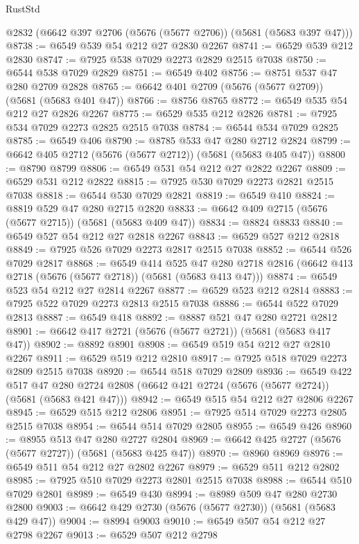 \begin{lexlean}{RustStd}
\begin{coremodule}
    @2832
    (@6642 @397 @2706 (@5676 (@5677 @2706)) (@5681 (@5683 @397 @47)))
@8738 := @6549 @539 @54 @212 @27 @2830 @2267
@8741 := @6529 @539 @212 @2830
@8747 := @7925 @538 @7029 @2273 @2829 @2515 @7038
@8750 := @6544 @538 @7029 @2829
@8751 := @6549 @402
@8756 := @8751 @537 @47 @280 @2709 @2828
@8765 := @6642 @401 @2709 (@5676 (@5677 @2709)) (@5681 (@5683 @401 @47))
@8766 := @8756 @8765
@8772 := @6549 @535 @54 @212 @27 @2826 @2267
@8775 := @6529 @535 @212 @2826
@8781 := @7925 @534 @7029 @2273 @2825 @2515 @7038
@8784 := @6544 @534 @7029 @2825
@8785 := @6549 @406
@8790 := @8785 @533 @47 @280 @2712 @2824
@8799 := @6642 @405 @2712 (@5676 (@5677 @2712)) (@5681 (@5683 @405 @47))
@8800 := @8790 @8799
@8806 := @6549 @531 @54 @212 @27 @2822 @2267
@8809 := @6529 @531 @212 @2822
@8815 := @7925 @530 @7029 @2273 @2821 @2515 @7038
@8818 := @6544 @530 @7029 @2821
@8819 := @6549 @410
@8824 := @8819 @529 @47 @280 @2715 @2820
@8833 := @6642 @409 @2715 (@5676 (@5677 @2715)) (@5681 (@5683 @409 @47))
@8834 := @8824 @8833
@8840 := @6549 @527 @54 @212 @27 @2818 @2267
@8843 := @6529 @527 @212 @2818
@8849 := @7925 @526 @7029 @2273 @2817 @2515 @7038
@8852 := @6544 @526 @7029 @2817
@8868 := @6549
    @414
    @525
    @47
    @280
    @2718
    @2816
    (@6642 @413 @2718 (@5676 (@5677 @2718)) (@5681 (@5683 @413 @47)))
@8874 := @6549 @523 @54 @212 @27 @2814 @2267
@8877 := @6529 @523 @212 @2814
@8883 := @7925 @522 @7029 @2273 @2813 @2515 @7038
@8886 := @6544 @522 @7029 @2813
@8887 := @6549 @418
@8892 := @8887 @521 @47 @280 @2721 @2812
@8901 := @6642 @417 @2721 (@5676 (@5677 @2721)) (@5681 (@5683 @417 @47))
@8902 := @8892 @8901
@8908 := @6549 @519 @54 @212 @27 @2810 @2267
@8911 := @6529 @519 @212 @2810
@8917 := @7925 @518 @7029 @2273 @2809 @2515 @7038
@8920 := @6544 @518 @7029 @2809
@8936 := @6549
    @422
    @517
    @47
    @280
    @2724
    @2808
    (@6642 @421 @2724 (@5676 (@5677 @2724)) (@5681 (@5683 @421 @47)))
@8942 := @6549 @515 @54 @212 @27 @2806 @2267
@8945 := @6529 @515 @212 @2806
@8951 := @7925 @514 @7029 @2273 @2805 @2515 @7038
@8954 := @6544 @514 @7029 @2805
@8955 := @6549 @426
@8960 := @8955 @513 @47 @280 @2727 @2804
@8969 := @6642 @425 @2727 (@5676 (@5677 @2727)) (@5681 (@5683 @425 @47))
@8970 := @8960 @8969
@8976 := @6549 @511 @54 @212 @27 @2802 @2267
@8979 := @6529 @511 @212 @2802
@8985 := @7925 @510 @7029 @2273 @2801 @2515 @7038
@8988 := @6544 @510 @7029 @2801
@8989 := @6549 @430
@8994 := @8989 @509 @47 @280 @2730 @2800
@9003 := @6642 @429 @2730 (@5676 (@5677 @2730)) (@5681 (@5683 @429 @47))
@9004 := @8994 @9003
@9010 := @6549 @507 @54 @212 @27 @2798 @2267
@9013 := @6529 @507 @212 @2798

\end{coremodule}
\end{lexlean}
